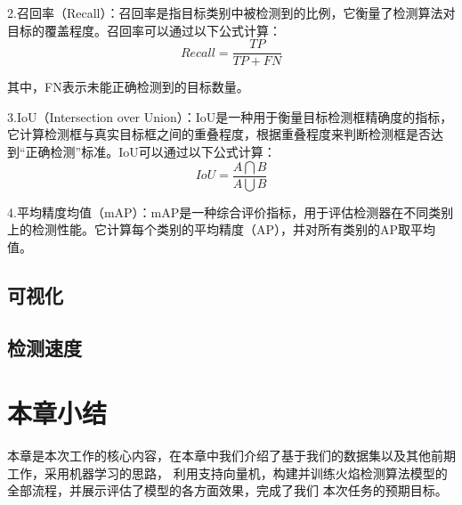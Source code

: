 2.召回率（Recall）：召回率是指目标类别中被检测到的比例，它衡量了检测算法对目标的覆盖程度。召回率可以通过以下公式计算：
\begin{equation} 
    Recall=\frac{TP}{TP+FN}
\end{equation}


其中，FN表示未能正确检测到的目标数量。

3.IoU（Intersection over Union）：IoU是一种用于衡量目标检测框精确度的指标，它计算检测框与真实目标框之间的重叠程度，根据重叠程度来判断检测框是否达到“正确检测”标准。IoU可以通过以下公式计算：
\begin{equation} 
    IoU=\frac{A\bigcap B}{A\bigcup B}
\end{equation}


4.平均精度均值（mAP）：mAP是一种综合评价指标，用于评估检测器在不同类别上的检测性能。它计算每个类别的平均精度（AP），并对所有类别的AP取平均值。


\subsection{可视化}
\subsection{检测速度}

\section{本章小结}
本章是本次工作的核心内容，在本章中我们介绍了基于我们的数据集以及其他前期工作，采用机器学习的思路，
利用支持向量机，构建并训练火焰检测算法模型的全部流程，并展示评估了模型的各方面效果，完成了我们
本次任务的预期目标。